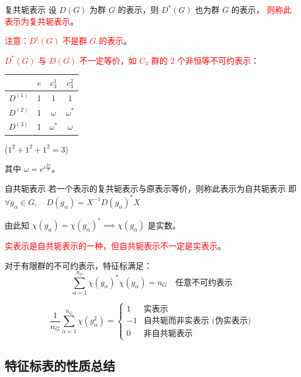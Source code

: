 \begin{definition}{复共轭表示}
    设 $D(G)$ 为群 $G$ 的表示，则 $D^*(G)$ 也为群 $G$ 的表示，
    \textcolor{red}{则称此表示为复共轭表示}。
    
    \textcolor{red}{注意：$D^\dagger(G)$ 不是群 $G$ 的表示}。
    
    \textcolor{red}{$D^*(G)$ 与 $D(G)$ 不一定等价，如 $C_3$ 群的 2 个非恒等不可约表示}：
    \begin{center}
    \begin{tabular}{c|ccc}
         & $e$ & $c_3^1$ & $c_3^2$ \\
        \hline
        $D^{(1)}$ & 1 & 1 & 1 \\
        $D^{(2)}$ & 1 & $\omega$ & $\omega^*$ \\
        $D^{(3)}$ & 1 & $\omega^*$ & $\omega$ \\
    \end{tabular}
    \quad ($1^2+1^2+1^2=3$)
    \end{center}
    其中 $\omega = e^{i\frac{2\pi}{3}}$。
\end{definition}

\begin{definition}{自共轭表示}
    若一个表示的复共轭表示与原表示等价，则称此表示为自共轭表示
    即 $\forall g_\alpha \in G, \quad D(g_\alpha) = X^{-1} D(g_\alpha)^* X$
    
    由此知 $\chi(g_\alpha) = \chi(g_\alpha)^* \implies \chi(g_\alpha)$ 是实数。
\end{definition}



\textcolor{red}{实表示是自共轭表示的一种，但自共轭表示不一定是实表示}。

对于有限群的不可约表示，特征标满足：
\begin{equation}
  \sum_{\alpha=1}^{n_G} \chi(g_\alpha)^{*} \chi(g_\alpha) =n_{G} \quad \text{任意不可约表示}
\end{equation}

\begin{equation}
    \frac{1}{n_G} \sum_{\alpha=1}^{n_G} \chi(g_\alpha^2) = \begin{cases} 1 & \text{实表示} \\ -1 & \text{自共轭而非实表示 (伪实表示)} \\ 0 & \text{非自共轭表示} \end{cases}
\end{equation}

\subsection{特征标表的性质总结}

